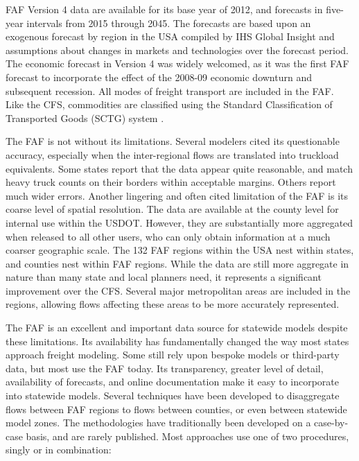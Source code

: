 FAF Version 4 data are available for its base year of 2012, and forecasts in five-year intervals from 2015 through 2045. The forecasts are based upon an exogenous forecast by region in the USA compiled by IHS Global Insight and assumptions about changes in markets and technologies over the forecast period. The economic forecast in Version 4 was widely welcomed, as it was the first FAF forecast to incorporate the effect of the 2008-09 economic downturn and subsequent recession. All modes of freight transport are included in the FAF. Like the CFS, commodities are classified using the Standard Classification of Transported Goods (SCTG) system \citep{bts15}.

The FAF is not without its limitations. Several modelers cited its questionable accuracy, especially when the inter-regional flows are translated into truckload equivalents. Some states report that the data appear quite reasonable, and match heavy truck counts on their borders within acceptable margins. Others report much wider errors. Another lingering and often cited limitation of the FAF is its coarse level of spatial resolution. The data are available at the county level for internal use within the USDOT. However, they are substantially more aggregated when released to all other users, who can only obtain information at a much coarser geographic scale. The 132 FAF regions within the USA nest within states, and counties nest within FAF regions. While the data are still more aggregate in nature than many state and local planners need, it represents a significant improvement over the CFS. Several major metropolitan areas are included in the regions, allowing flows affecting these areas to be more accurately represented.

The FAF is an excellent and important data source for statewide models despite these limitations. Its availability has fundamentally changed the way most states approach freight modeling. Some still rely upon bespoke models or third-party data, but most use the FAF today. Its transparency, greater level of detail, availability of forecasts, and online documentation make it easy to incorporate into statewide models. Several techniques have been developed to disaggregate flows between FAF regions to flows between counties, or even between statewide model zones. The methodologies have traditionally been developed on a case-by-case basis, and are rarely published. Most approaches use one of two procedures, singly or in combination:

